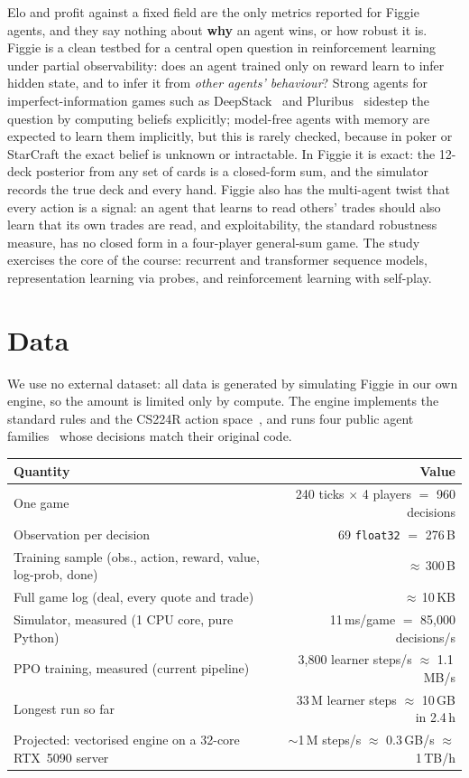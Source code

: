 \documentclass{article}
\begin{document}
Elo and profit against a fixed field are the only metrics reported for Figgie agents, and they say nothing about \textbf{why} an agent wins, or how robust it is.
Figgie is a clean testbed for a central open question in reinforcement learning under partial observability: does an agent trained only on reward learn to infer hidden state, and to infer it from \emph{other agents' behaviour}? Strong agents for imperfect-information games such as DeepStack~\cite{deepstack} and Pluribus~\cite{pluribus} sidestep the question by computing beliefs explicitly; model-free agents with memory are expected to learn them implicitly, but this is rarely checked, because in poker or StarCraft the exact belief is unknown or intractable. In Figgie it is exact: the 12-deck posterior from any set of cards is a closed-form sum, and the simulator records the true deck and every hand. Figgie also has the multi-agent twist that every action is a signal: an agent that learns to read others' trades should also learn that its own trades are read, and exploitability, the standard robustness measure, has no closed form in a four-player general-sum game. The study exercises the core of the course: recurrent and transformer sequence models, representation learning via probes, and reinforcement learning with self-play.

\section{Data}
We use no external dataset: all data is generated by simulating Figgie in our own engine, so the amount is limited only by compute. The engine implements the standard rules and the CS224R action space~\cite{cs224r}, and runs four public agent families~\cite{figment,figgiebot,figgieauto} whose decisions match their original code.

\begin{tabular}{@{}lr@{}}
\toprule
Quantity & Value \\
\midrule
One game & 240 ticks $\times$ 4 players $=$ 960 decisions \\
Observation per decision & 69 \texttt{float32} $=$ 276\,B \\
Training sample (obs., action, reward, value, log-prob, done) & $\approx$\,300\,B \\
Full game log (deal, every quote and trade) & $\approx$\,10\,KB \\
\midrule
Simulator, measured (1 CPU core, pure Python) & 11\,ms/game $=$ 85{,}000 decisions/s \\
PPO training, measured (current pipeline) & 3{,}800 learner steps/s $\approx$ 1.1\,MB/s \\
Longest run so far & 33\,M learner steps $\approx$ 10\,GB in 2.4\,h \\
\midrule
Projected: vectorised engine on a 32-core RTX~5090 server & $\sim$1\,M steps/s $\approx$ 0.3\,GB/s $\approx$ 1\,TB/h \\
\bottomrule
\end{tabular}
\end{document}
